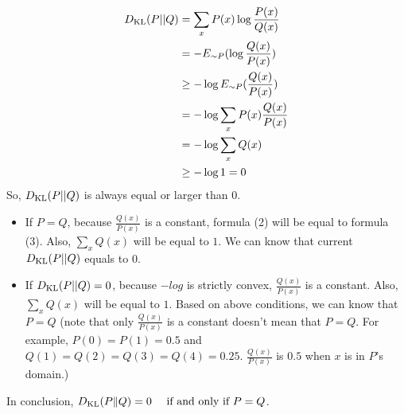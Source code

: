 \begin{answer}
\begin{align}
    D_{\text{KL}}(P||Q) &= \sum\limits_x P(x) \log \frac{P(x)}{Q(x)}\\
    &= -E_{\sim P}(\log \frac{Q(x)}{P(x)})\\
    &\geq -\log E_{\sim P}(\frac{Q(x)}{P(x)})\\
    &= - \log \sum\limits_x P(x) \frac{Q(x)}{P(x)}\\
    &= - \log \sum\limits_x Q(x)\\
    &\geq -\log 1 = 0\\
\end{align}
So, $D_{\text{KL}}(P||Q)$ is always equal or larger than $0$.\\
\begin{itemize}
    \item If $P = Q$, because $\frac{Q(x)}{P(x)}$ is a constant, formula (2) will be equal to formula (3). Also, $\sum\limits_x Q(x)$ will be equal to $1$. We can know that current $D_{\text{KL}}(P||Q)$ equals to $0$.
    \item If $D_{\text{KL}}(P||Q) = 0$, because $-log$ is strictly convex, $\frac{Q(x)}{P(x)}$ is a constant. Also, $\sum\limits_x Q(x)$ will be equal to $1$. Based on above conditions, we can know that $P = Q$ (note that only $\frac{Q(x)}{P(x)}$ is a constant doesn't mean that $P=Q$. For example, $P(0) = P(1) = 0.5$ and $Q(1) = Q(2) = Q(3) = Q(4) = 0.25$. $\frac{Q(x)}{P(x)}$ is $0.5$ when $x$ is in $P$'s domain.) 
\end{itemize}
In conclusion, $D_{\text{KL}}(P\|Q) = 0 \ \ \ \mbox{ if and only if } P=Q$.
\end{answer}
